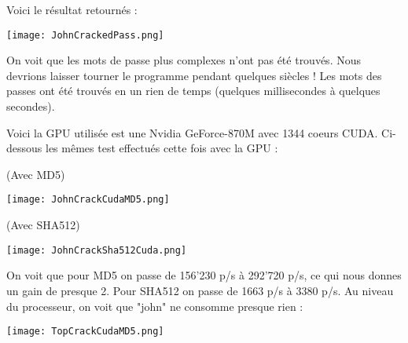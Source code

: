 Voici le résultat retournés :
\begin{center} 
\hspace{15cm}
\texttt{[image: JohnCrackedPass.png]}
\end{center}
\vspace{0.5cm}

On voit que les mots de passe plus complexes n'ont pas été trouvés. Nous devrions laisser tourner le programme pendant quelques siècles ! Les mots des passes ont été trouvés en un rien de temps (quelques millisecondes à quelques secondes).

\pagebreak
Voici la GPU utilisée est une Nvidia GeForce-870M avec 1344 coeurs CUDA. Ci-dessous les mêmes test effectués cette fois avec la GPU :

(Avec MD5)
\begin{center} 
\hspace{15cm}
\texttt{[image: JohnCrackCudaMD5.png]}
\end{center}
\vspace{0.5cm}

(Avec SHA512)
\begin{center} 
\hspace{15cm}
\texttt{[image: JohnCrackSha512Cuda.png]}
\end{center}
\vspace{0.5cm}

On voit que pour MD5 on passe de 156'230 p/s à 292'720 p/s, ce qui nous donnes un gain de presque 2. Pour SHA512 on passe de 1663 p/s à 3380 p/s. Au niveau du processeur, on voit que "john" ne consomme presque rien :
\begin{center} 
\hspace{15cm}
\texttt{[image: TopCrackCudaMD5.png]}
\end{center}
\vspace{0.5cm}
